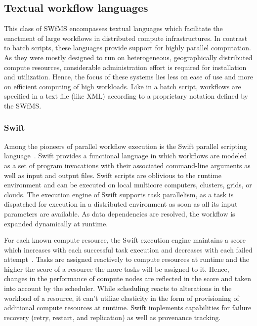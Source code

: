 \subsection{Textual workflow languages}
\label{Textual}

This class of SWfMS encompasses textual languages which facilitate the enactment of large workflows in distributed compute infrastructures. In contrast to batch scripts, these languages provide support for highly parallel computation. As they were mostly designed to run on heterogeneous, geographically distributed compute resources, considerable administration effort is required for installation and utilization. Hence, the focus of these systems lies less on ease of use and more on efficient computing of high workloads. Like in a batch script, workflows are specified in a text file (like XML) according to a proprietary notation defined by the SWfMS.

\subsubsection{Swift}
Among the pioneers of parallel workflow execution is the Swift parallel scripting language~\citep{Zhao07}. Swift provides a functional language in which workflows are modeled as a set of program invocations with their associated command-line arguments as well as input and output files. Swift scripts are oblivious to the runtime environment and can be executed on local multicore computers, clusters, grids, or clouds. The execution engine of Swift supports task parallelism, as a task is dispatched for execution in a distributed environment as soon as all its input parameters are available. As data dependencies are resolved, the workflow is expanded dynamically at runtime.

For each known compute resource, the Swift execution engine maintains a score which increases with each successful task execution and decreases with each failed attempt~\citep{Wilde2011}. Tasks are assigned reactively to compute resources at runtime and the higher the score of a resource the more tasks will be assigned to it. Hence, changes in the performance of compute nodes are reflected in the score and taken into account by the scheduler. While scheduling reacts to alterations in the workload of a resource, it can't utilize elasticity in the form of provisioning of additional compute resources at runtime. Swift implements capabilities for failure recovery (retry, restart, and replication) as well as provenance tracking.

